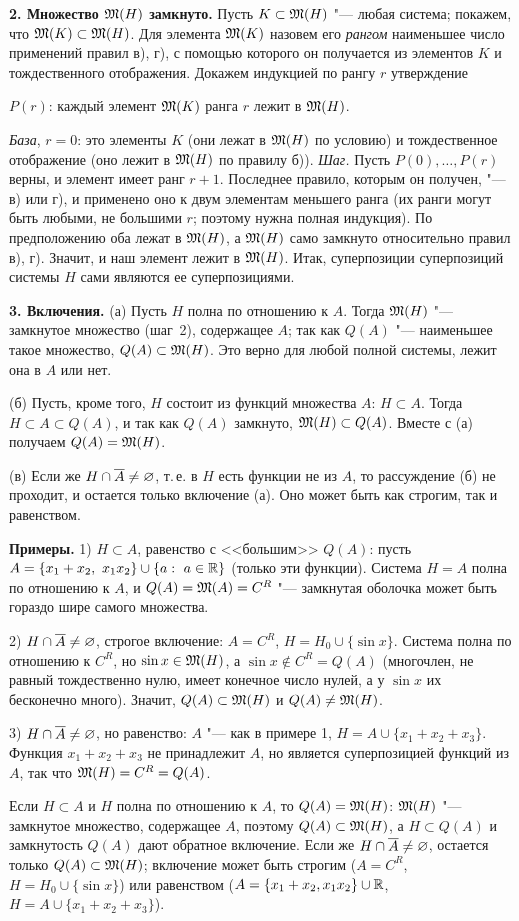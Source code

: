 \begin{solution}[4 (\S\,4)]
\textbf{2. Множество $\mathfrak M(H)$ замкнуто.} Пусть $K\subset\mathfrak M(H)$ "--- любая
система; покажем, что $\mathfrak M(K)\subset\mathfrak M(H)$. Для элемента $\mathfrak M(K)$ назовем
его \emph{рангом} наименьшее число применений правил в), г), с помощью
которого он получается из элементов $K$ и тождественного отображения.
Докажем индукцией по рангу $r$ утверждение
\begin{keystmt}
$P(r)$: каждый элемент $\mathfrak M(K)$ ранга $r$ лежит в $\mathfrak M(H)$.
\end{keystmt}
\emph{База}, $r=0$: это элементы $K$ (они лежат в $\mathfrak M(H)$ по условию) и
тождественное отображение (оно лежит в $\mathfrak M(H)$ по правилу б)).
\emph{Шаг.} Пусть $P(0),\dots,P(r)$ верны, и элемент имеет ранг $r+1$.
Последнее правило, которым он получен, "--- в) или г), и применено оно
к двум элементам меньшего ранга (их ранги могут быть любыми, не
большими $r$; поэтому нужна полная индукция). По предположению оба лежат
в $\mathfrak M(H)$, а $\mathfrak M(H)$ само замкнуто относительно правил в), г). Значит, и
наш элемент лежит в $\mathfrak M(H)$. Итак, суперпозиции суперпозиций системы $H$
сами являются ее суперпозициями.

\textbf{3. Включения.} (а) Пусть $H$ полна по отношению к $A$. Тогда
$\mathfrak M(H)$ "--- замкнутое множество (шаг~2), содержащее $A$; так как $Q(A)$
"--- наименьшее такое множество, $Q(A)\subset\mathfrak M(H)$. Это верно для любой
полной системы, лежит она в $A$ или нет.

(б) Пусть, кроме того, $H$ состоит из функций множества $A$: $H\subset A$.
Тогда $H\subset A\subset Q(A)$, и так как $Q(A)$ замкнуто, $\mathfrak M(H)\subset Q(A)$.
Вместе с (а) получаем $Q(A)=\mathfrak M(H)$.

(в) Если же $H\cap\overline{A}\ne\varnothing$, т.\,е. в $H$ есть функции не из $A$,
то рассуждение (б) не проходит, и остается только включение (а). Оно может
быть как строгим, так и равенством.

\textbf{Примеры.} 1) $H\subset A$, равенство с <<большим>> $Q(A)$: пусть
$A=\{x_1+x_2,\ x_1x_2\}\cup\{a:\ a\in\R\}$ (только эти функции). Система
$H=A$ полна по отношению к $A$, и $Q(A)=\mathfrak M(A)=C^R$ "--- замкнутая оболочка
может быть гораздо шире самого множества.

2) $H\cap\overline{A}\ne\varnothing$, строгое включение: $A=C^R$,
$H=H_0\cup\{\sin x\}$. Система полна по отношению к $C^R$, но
$\sin x\in\mathfrak M(H)$, а $\sin x\notin C^R=Q(A)$ (многочлен, не равный тождественно
нулю, имеет конечное число нулей, а у $\sin x$ их бесконечно много).
Значит, $Q(A)\subset\mathfrak M(H)$ и $Q(A)\ne\mathfrak M(H)$.

3) $H\cap\overline{A}\ne\varnothing$, но равенство: $A$ "--- как в примере 1,
$H=A\cup\{x_1+x_2+x_3\}$. Функция $x_1+x_2+x_3$ не принадлежит $A$, но
является суперпозицией функций из $A$, так что $\mathfrak M(H)=C^R=Q(A)$.

\answer Если $H\subset A$ и $H$ полна по отношению к $A$, то $Q(A)=\mathfrak M(H)$:
$\mathfrak M(H)$ "--- замкнутое множество, содержащее $A$, поэтому $Q(A)\subset\mathfrak M(H)$,
а $H\subset Q(A)$ и замкнутость $Q(A)$ дают обратное включение. Если же
$H\cap\overline{A}\ne\varnothing$, остается только $Q(A)\subset\mathfrak M(H)$; включение может
быть строгим ($A=C^R$, $H=H_0\cup\{\sin x\}$) или равенством
($A=\{x_1+x_2,x_1x_2\}\cup\mathbb R$, $H=A\cup\{x_1+x_2+x_3\}$).
\end{solution}

